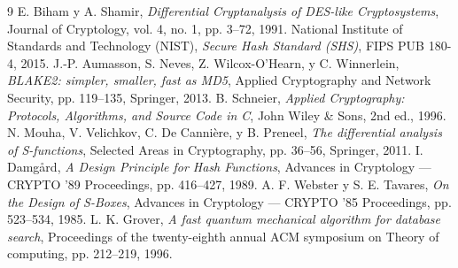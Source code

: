 \documentclass[10pt,journal,compsoc]{IEEEtran}
\begin{document}

\begin{thebibliography}{9}
E. Biham y A. Shamir, \emph{Differential Cryptanalysis of DES-like Cryptosystems}, Journal of Cryptology, vol. 4, no. 1, pp. 3--72, 1991.
National Institute of Standards and Technology (NIST), \emph{Secure Hash Standard (SHS)}, FIPS PUB 180-4, 2015.
J.-P. Aumasson, S. Neves, Z. Wilcox-O'Hearn, y C. Winnerlein, \emph{BLAKE2: simpler, smaller, fast as MD5}, Applied Cryptography and Network Security, pp. 119--135, Springer, 2013.
B. Schneier, \emph{Applied Cryptography: Protocols, Algorithms, and Source Code in C}, John Wiley \& Sons, 2nd ed., 1996.
N. Mouha, V. Velichkov, C. De Canni{\`e}re, y B. Preneel, \emph{The differential analysis of S-functions}, Selected Areas in Cryptography, pp. 36--56, Springer, 2011.
I. Damgård, \emph{A Design Principle for Hash Functions}, Advances in Cryptology — CRYPTO '89 Proceedings, pp. 416--427, 1989.
A. F. Webster y S. E. Tavares, \emph{On the Design of S-Boxes}, Advances in Cryptology — CRYPTO '85 Proceedings, pp. 523--534, 1985.
L. K. Grover, \emph{A fast quantum mechanical algorithm for database search}, Proceedings of the twenty-eighth annual ACM symposium on Theory of computing, pp. 212--219, 1996.
\end{thebibliography}
\end{document}
